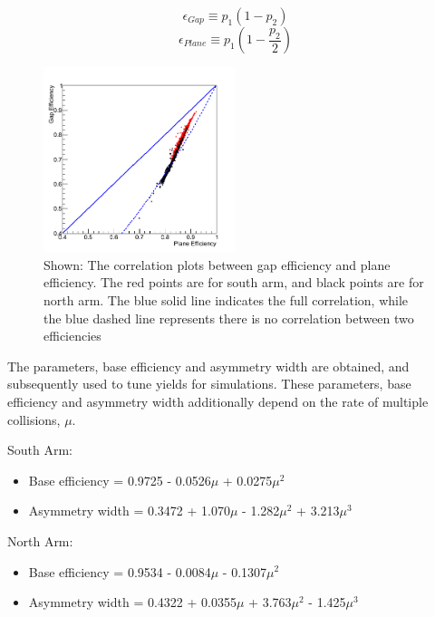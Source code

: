\begin{equation}[b]
\epsilon_{Gap}\equiv p_{1}(1-p_{2})
\end{equation}
\begin{equation}
\epsilon_{Plane}\equiv p_{1}(1-\frac{p_{2}}{2})
\end{equation}

\begin{figure}
  \centering
  \includegraphics[width=0.5\textwidth]{./figures/mutr_hiteff_run13_scat.png}
  \caption{
    Shown: The correlation plots between gap efficiency and plane efficiency.
    The red points are for south arm, and black points are for north arm. The
    blue solid line indicates the full correlation, while the blue dashed line
    represents there is no correlation between two efficiencies~\cite{Seidl2014}
  }
  \label{Fig:efficiency:MuTrEff:scat}
\end{figure}

The parameters, base efficiency and asymmetry width are obtained, and
subsequently used to tune yields for simulations. These parameters, base
efficiency and asymmetry width additionally depend on the rate of multiple
collisions, $\mu$.

{\noindent}South Arm:
\begin{itemize}
  \item Base efficiency = 0.9725 - 0.0526$\mu$ + 0.0275$\mu^{2}$
  \item Asymmetry width = 0.3472 + 1.070$\mu$ - 1.282$\mu^{2}$ + 3.213$\mu^{3}$
\end{itemize}

{\noindent}North Arm:
\begin{itemize}
  \item Base efficiency = 0.9534 - 0.0084$\mu$ - 0.1307$\mu^{2}$
  \item Asymmetry width = 0.4322 + 0.0355$\mu$ + 3.763$\mu^{2}$ - 1.425$\mu^{3}$
\end{itemize}

